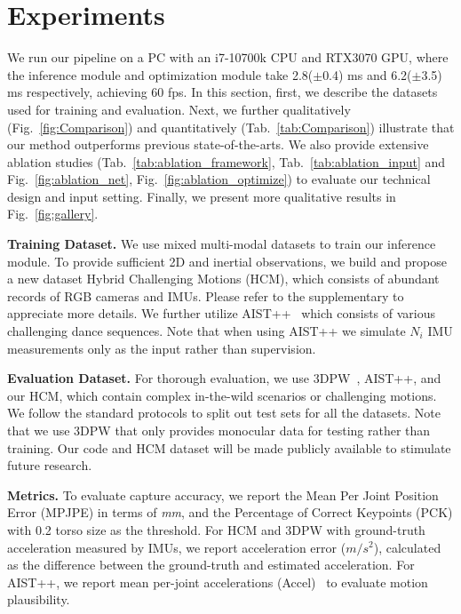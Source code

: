 \documentclass[letterpaper]{article} \usepackage{aaai23}  \usepackage{times}  \usepackage{helvet}  \usepackage{courier}  \usepackage[hyphens]{url}  \usepackage{graphicx} \urlstyle{rm} \def\UrlFont{\rm}  \usepackage{natbib}  \usepackage{caption} \frenchspacing  \setlength{\pdfpagewidth}{8.5in}  \setlength{\pdfpageheight}{11in}  \usepackage{algorithm}
\newcommand{\myparagraph}[1]{\vspace{0.1em}\noindent\textbf{#1}}
\begin{document}
\section{Experiments}
\label{ExperimentalResults}
We run our pipeline on a PC with an i7-10700k CPU and RTX3070 GPU, where the inference module and optimization module take 2.8($\pm$0.4) ms and 6.2($\pm$3.5) ms respectively, achieving 60 fps. 
In this section, first, we describe the datasets used for training and evaluation. 
Next, we further qualitatively (Fig.~\ref{fig:Comparison}) and quantitatively (Tab.~\ref{tab:Comparison}) illustrate that our method outperforms previous state-of-the-arts.
We also provide extensive ablation studies (Tab.~\ref{tab:ablation_framework}, Tab.~\ref{tab:ablation_input} and Fig.~\ref{fig:ablation_net}, Fig.~\ref{fig:ablation_optimize}) to evaluate our technical design and input setting.
Finally, we present more qualitative results in Fig.~\ref{fig:gallery}.



\myparagraph{Training Dataset.}
We use mixed multi-modal datasets to train our inference module.
To provide sufficient 2D and inertial observations, we build and propose a new dataset Hybrid Challenging Motions (HCM), which consists of abundant records of RGB cameras and IMUs. Please refer to the supplementary to appreciate more details.
We further utilize AIST++~\cite{li2021learn,aist-dance-db} which consists of various challenging dance sequences. 
Note that when using AIST++ we simulate $N_i$ IMU measurements only as the input rather than supervision. 

\myparagraph{Evaluation Dataset.}
For thorough evaluation, we use 3DPW~\cite{vonMarcard2018}, AIST++, and our HCM, which contain complex in-the-wild scenarios or challenging motions. We follow the standard protocols to split out test sets for all the datasets.
Note that we use 3DPW that only provides monocular data for testing rather than training. 
Our code and HCM dataset will be made publicly available to stimulate future research.

\myparagraph{Metrics.}
To evaluate capture accuracy, we report the Mean Per Joint Position Error (MPJPE) in terms of \textit{mm}, and the Percentage of Correct Keypoints (PCK) with 0.2 torso size as the threshold. For HCM and 3DPW with ground-truth acceleration measured by IMUs, we report acceleration error ($m/s^2$), calculated as the difference between the 
ground-truth and estimated acceleration. For AIST++, we report mean per-joint accelerations (Accel)~\cite{Kanazawa_2019CVPR,HUMOR_ICCV2021} to evaluate motion plausibility.
\end{document}
